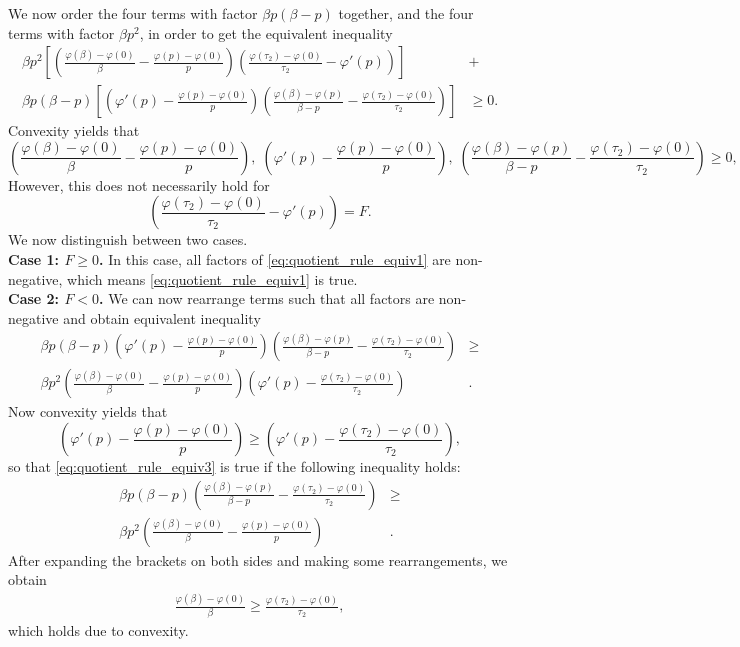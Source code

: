 \documentclass[11pt]{article}
\newcommand{\1}{\mathds{1}}
\begin{document}
We now order the four terms with factor $\beta p(\beta-p)$ together, and the four terms with factor $\beta p^2$, in order to get the equivalent inequality 
\begin{align}
\beta p^2\left[ \left( \frac{\varphi(\beta) - \varphi(0)}{\beta} - \frac{\varphi(p) - \varphi(0)}{p}\right) \left(\frac{\varphi(\tau_2) - \varphi(0)}{\tau_2} - \varphi'(p) \right)\right] & + \nonumber \\[1.5ex]
\beta p(\beta-p)\left[ \left( \varphi'(p) - \frac{\varphi(p) - \varphi(0)}{p}\right) \left(\frac{\varphi(\beta) - \varphi(p)}{\beta-p} - \frac{\varphi(\tau_2) - \varphi(0)}{\tau_2} \right)\right] & \geq 0.
\label{eq:quotient_rule_equiv1}
\end{align}
Convexity yields that 
$$
\left( \frac{\varphi(\beta) - \varphi(0)}{\beta} - \frac{\varphi(p) - \varphi(0)}{p}\right),\; \left( \varphi'(p) - \frac{\varphi(p) - \varphi(0)}{p}\right), \; \left(\frac{\varphi(\beta) - \varphi(p)}{\beta-p} - \frac{\varphi(\tau_2) - \varphi(0)}{\tau_2} \right) \geq 0,
$$
However, this does not necessarily hold for $$\left(\frac{\varphi(\tau_2) - \varphi(0)}{\tau_2} - \varphi'(p) \right) = F.$$ We now distinguish between two cases.\\
\noindent \textbf{Case 1: $F \geq 0$.} In this case, all factors of \eqref{eq:quotient_rule_equiv1} are non-negative, which means \eqref{eq:quotient_rule_equiv1} is true.\\
\noindent \textbf{Case 2: $F < 0$.} We can now rearrange terms such that all factors are non-negative and obtain equivalent inequality
\begin{align}
\beta p(\beta-p) \left( \varphi'(p) - \frac{\varphi(p) - \varphi(0)}{p}\right) \left(\frac{\varphi(\beta) - \varphi(p)}{\beta-p} - \frac{\varphi(\tau_2) - \varphi(0)}{\tau_2} \right) & \geq \nonumber \\
\beta p^2 \left( \frac{\varphi(\beta) - \varphi(0)}{\beta} - \frac{\varphi(p) - \varphi(0)}{p}\right) \left(\varphi'(p) - \frac{\varphi(\tau_2) - \varphi(0)}{\tau_2} \right)&.
\label{eq:quotient_rule_equiv3}
\end{align}
\noindent Now convexity yields that
$$\left( \varphi'(p) - \frac{\varphi(p) - \varphi(0)}{p}\right) \geq \left(\varphi'(p) - \frac{\varphi(\tau_2) - \varphi(0)}{\tau_2} \right),$$
so that \eqref{eq:quotient_rule_equiv3} is true if the following inequality holds:
\begin{align}
\beta p(\beta-p) \left(\frac{\varphi(\beta) - \varphi(p)}{\beta-p} - \frac{\varphi(\tau_2) - \varphi(0)}{\tau_2} \right) & \geq \nonumber \\
\beta p^2 \left( \frac{\varphi(\beta) - \varphi(0)}{\beta} - \frac{\varphi(p) - \varphi(0)}{p}\right) &.
\label{eq:quotient_rule_equiv4}
\end{align}
After expanding the brackets on both sides and making some rearrangements, we obtain
\begin{align}
\frac{\varphi(\beta)-\varphi(0)}{\beta} \geq \frac{\varphi(\tau_2)-\varphi(0)}{\tau_2},
\label{eq:quotient_rule_equiv5}
\end{align}
which holds due to convexity.
\end{document}
